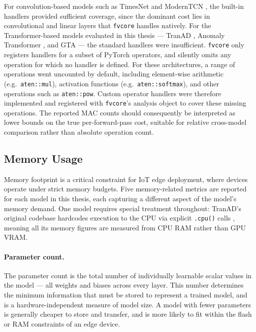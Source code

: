 \documentclass[twoside,11pt,openright]{report}
\begin{document}
For convolution-based models such as TimesNet \cite{timesnet2023} and ModernTCN
\cite{moderntcn2024}, the built-in handlers provided sufficient coverage, since the
dominant cost lies in convolutional and linear layers that \texttt{fvcore} handles
natively. For the Transformer-based models evaluated in this thesis --- TranAD
\cite{tranad2022}, Anomaly Transformer \cite{anomalytransformer2022}, and GTA
\cite{gta2022} --- the standard handlers were insufficient. \texttt{fvcore} only
registers handlers for a subset of PyTorch operators, and silently omits any operation
for which no handler is defined. For these architectures, a range of operations went
uncounted by default, including element-wise arithmetic (e.g.\ \texttt{aten::mul}), 
activation functions (e.g.\ \texttt{aten::softmax}), and other operations such as
\texttt{aten::pow}. Custom operator handlers were therefore
implemented and registered with \texttt{fvcore}'s analysis object to cover these
missing operations. The reported MAC counts should consequently be
interpreted as lower bounds on the true per-forward-pass cost, suitable for relative
cross-model comparison rather than absolute operation count.

\subsection{Memory Usage}
\label{subsec:memory}

Memory footprint is a critical constraint for IoT edge deployment, where devices
operate under strict memory budgets. Five memory-related metrics are reported for each model in this thesis,
each capturing a different aspect of the model's memory demand. One model requires special 
treatment throughout: TranAD's original codebase hardcodes execution to the CPU via explicit 
\texttt{.cpu()} calls \citep{tranad2022}, meaning all its memory figures are measured from 
CPU RAM rather than GPU VRAM.

\paragraph{Parameter count.}
The parameter count is the total number of individually learnable scalar values in
the model --- all weights and biases across every layer. This number determines the
minimum information that must be stored to represent a trained model, and is a
hardware-independent measure of model size. A model with fewer parameters is
generally cheaper to store and transfer, and is more likely to fit within the flash
or RAM constraints of an edge device.
\end{document}
